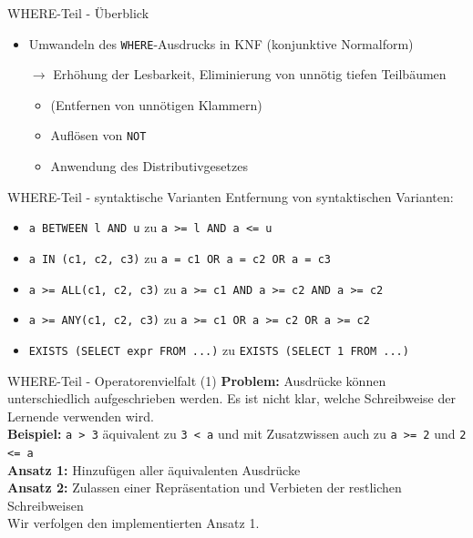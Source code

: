 \documentclass{beamer}
\begin{document}
\begin{frame}[fragile]{WHERE-Teil - Überblick}
\begin{itemize}
\item Umwandeln des \verb|WHERE|-Ausdrucks in KNF (konjunktive Normalform) 
\item[$\to$] Erhöhung der Lesbarkeit, Eliminierung von unnötig tiefen Teilbäumen
\item[] \begin{itemize}
		\item (Entfernen von unnötigen Klammern)
		\item Auflösen von \verb|NOT| 
		\item Anwendung des Distributivgesetzes
	  \end{itemize}

\end{itemize}
\end{frame}


\begin{frame}[fragile]{WHERE-Teil - syntaktische Varianten}
Entfernung von syntaktischen Varianten:
\begin{itemize}
\item \verb|a BETWEEN l AND u| zu \verb|a >= l AND a <= u|
\item \verb|a IN (c1, c2, c3)| zu \verb|a = c1 OR a = c2 OR a = c3|
\item \verb|a >= ALL(c1, c2, c3)| zu \verb|a >= c1 AND a >= c2 AND a >= c2|
\item \verb|a >= ANY(c1, c2, c3)| zu \verb|a >= c1 OR a >= c2 OR a >= c2|
\item \verb|EXISTS (SELECT expr FROM ...)| zu \verb|EXISTS (SELECT 1 FROM ...)|
\end{itemize}
\end{frame}

\begin{frame}[fragile]{WHERE-Teil - Operatorenvielfalt (1)}
\textbf{Problem:} Ausdrücke können unterschiedlich aufgeschrieben werden. Es ist nicht klar, welche Schreibweise der Lernende verwenden wird.\\
\textbf{Beispiel:} \verb|a > 3| äquivalent zu \verb|3 < a| und mit Zusatzwissen auch zu \verb|a >= 2| und \verb|2 <= a|\\
\vspace{5mm}
\textbf{Ansatz 1:} Hinzufügen aller äquivalenten Ausdrücke\\
\textbf{Ansatz 2:} Zulassen einer Repräsentation und Verbieten der restlichen Schreibweisen\\
\vspace{5mm}
Wir verfolgen den implementierten Ansatz 1.
\end{frame}
\end{document}
